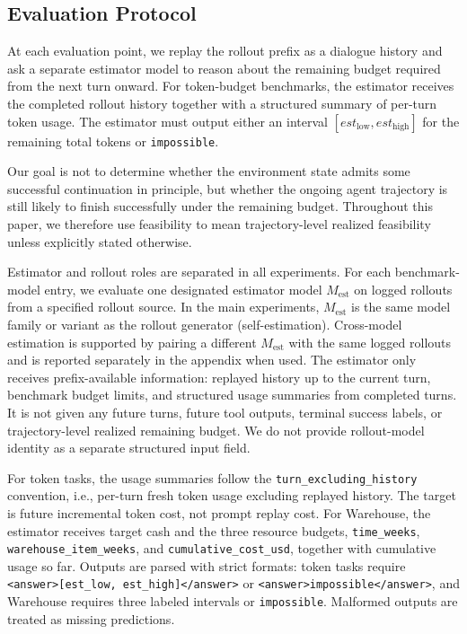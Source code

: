 \subsection{Evaluation Protocol}
\label{sec:evaluation-protocol}

At each evaluation point, we replay the rollout prefix as a dialogue history and ask a separate estimator model to reason about the remaining budget required from the next turn onward. For token-budget benchmarks, the estimator receives the completed rollout history together with a structured summary of per-turn token usage. The estimator must output either an interval $[est_{\mathrm{low}}, est_{\mathrm{high}}]$ for the remaining total tokens or \texttt{impossible}.

Our goal is not to determine whether the environment state admits some successful continuation in principle, but whether the ongoing agent trajectory is still likely to finish successfully under the remaining budget. Throughout this paper, we therefore use feasibility to mean trajectory-level realized feasibility unless explicitly stated otherwise.

Estimator and rollout roles are separated in all experiments. For each benchmark-model entry, we evaluate one designated estimator model $M_{\mathrm{est}}$ on logged rollouts from a specified rollout source. In the main experiments, $M_{\mathrm{est}}$ is the same model family or variant as the rollout generator (self-estimation). Cross-model estimation is supported by pairing a different $M_{\mathrm{est}}$ with the same logged rollouts and is reported separately in the appendix when used. The estimator only receives prefix-available information: replayed history up to the current turn, benchmark budget limits, and structured usage summaries from completed turns. It is not given any future turns, future tool outputs, terminal success labels, or trajectory-level realized remaining budget. We do not provide rollout-model identity as a separate structured input field.

For token tasks, the usage summaries follow the \texttt{turn\_excluding\_history} convention, i.e., per-turn fresh token usage excluding replayed history. The target is future incremental token cost, not prompt replay cost. For Warehouse, the estimator receives target cash and the three resource budgets, \texttt{time\_weeks}, \texttt{warehouse\_item\_weeks}, and \texttt{cumulative\_cost\_usd}, together with cumulative usage so far. Outputs are parsed with strict formats: token tasks require \verb|<answer>[est_low, est_high]</answer>| or \verb|<answer>impossible</answer>|, and Warehouse requires three labeled intervals or \texttt{impossible}. Malformed outputs are treated as missing predictions.

